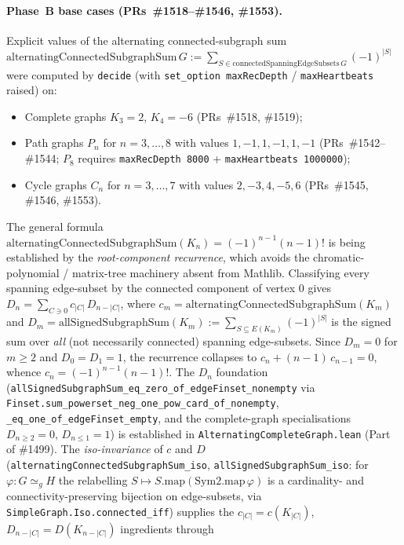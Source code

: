 \documentclass[a4paper,11pt]{article}
\begin{document}
\paragraph{Phase~B base cases (PRs~\#1518--\#1546, \#1553).}
Explicit values of the alternating connected-subgraph sum
$\mathrm{alternatingConnectedSubgraphSum}\,G
:= \sum_{S \in \mathrm{connectedSpanningEdgeSubsets}\,G} (-1)^{|S|}$
were computed by \texttt{decide} (with
\texttt{set\_option maxRecDepth} / \texttt{maxHeartbeats} raised) on:
\begin{itemize}
  \item Complete graphs \(K_3 = 2\), \(K_4 = -6\)
    (PRs~\#1518, \#1519);
  \item Path graphs \(P_n\) for \(n = 3,\dots,8\) with values
    \(1, -1, 1, -1, 1, -1\) (PRs~\#1542--\#1544; \(P_8\) requires
    \texttt{maxRecDepth 8000} + \texttt{maxHeartbeats 1000000});
  \item Cycle graphs \(C_n\) for \(n = 3,\dots,7\) with values
    \(2, -3, 4, -5, 6\) (PRs~\#1545, \#1546, \#1553).
\end{itemize}
The general formula
$\mathrm{alternatingConnectedSubgraphSum}(K_n) = (-1)^{n-1}(n-1)!$
is being established by the \emph{root-component recurrence}, which avoids the
chromatic-polynomial / matrix-tree machinery absent from Mathlib. Classifying
every spanning edge-subset by the connected component of vertex $0$ gives
$D_n = \sum_{C \ni 0} c_{|C|}\, D_{n-|C|}$, where
$c_m = \mathrm{alternatingConnectedSubgraphSum}(K_m)$ and
$D_m = \mathrm{allSignedSubgraphSum}(K_m) := \sum_{S \subseteq E(K_m)} (-1)^{|S|}$
is the signed sum over \emph{all} (not necessarily connected) spanning
edge-subsets. Since $D_m = 0$ for $m \ge 2$ and $D_0 = D_1 = 1$, the recurrence
collapses to $c_n + (n-1)\,c_{n-1} = 0$, whence
$c_n = (-1)^{n-1}(n-1)!$. The $D_n$ foundation
(\texttt{allSignedSubgraphSum\_eq\_zero\_of\_edgeFinset\_nonempty} via
\texttt{Finset.sum\_powerset\_neg\_one\_pow\_card\_of\_nonempty},
\texttt{\_eq\_one\_of\_edgeFinset\_empty}, and the complete-graph specialisations
$D_{n \ge 2} = 0$, $D_{n \le 1} = 1$) is established in
\texttt{AlternatingCompleteGraph.lean} (Part of \#1499). The
\emph{iso-invariance} of $c$ and $D$
(\texttt{alternatingConnectedSubgraphSum\_iso},
\texttt{allSignedSubgraphSum\_iso}: for $\varphi : G \simeq_g H$ the relabelling
$S \mapsto S.\mathrm{map}(\mathrm{Sym2.map}\,\varphi)$ is a cardinality- and
connectivity-preserving bijection on edge-subsets, via
\texttt{SimpleGraph.Iso.connected\_iff}) supplies the
$c_{|C|} = c(K_{|C|})$, $D_{n-|C|} = D(K_{n-|C|})$ ingredients through
\end{document}

